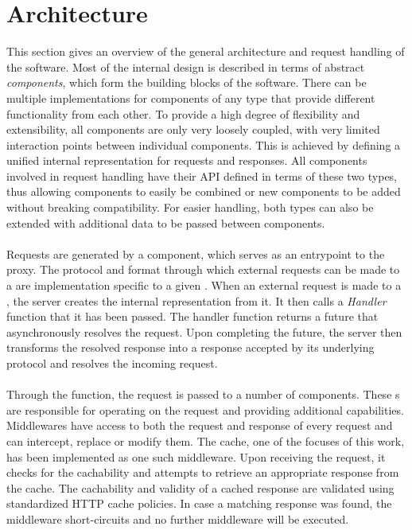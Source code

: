 \chapter{Architecture}
\label{architecture}

This section gives an overview of the general architecture and request handling of the software. Most of the internal design is described in terms of abstract \textit{components}, which form the building blocks of the software. There can be multiple implementations for components of any type that provide different functionality from each other.
To provide a high degree of flexibility and extensibility, all components are only very loosely coupled, with very limited interaction points between individual components. This is achieved by defining a unified internal representation for requests and responses. All components involved in request handling have their API defined in terms of these two types, thus allowing components to easily be combined or new components to be added without breaking compatibility. For easier handling, both types can also be extended with additional data to be passed between components.
\\\\
Requests are generated by a  component, which serves as an entrypoint to the proxy. The protocol and format through which external requests can be made to a  are implementation specific to a given . When an external request is made to a , the server creates the internal representation from it. It then calls a \textit{Handler} function that it has been passed. The handler function returns a future that asynchronously resolves the request. Upon completing the future, the server then transforms the resolved response into a response accepted by its underlying protocol and resolves the incoming request.
\\\\
Through the  function, the request is passed to a number of  components. These s are responsible for operating on the request and providing additional capabilities.
Middlewares have access to both the request and response of every request and can intercept, replace or modify them.
The cache, one of the focuses of this work, has been implemented as one such middleware. Upon receiving the request, it checks for the cachability and attempts to retrieve an appropriate response from the cache. The cachability and validity of a cached response are validated using standardized HTTP cache policies. In case a matching response was found, the middleware short-circuits and no further middleware will be executed. 
